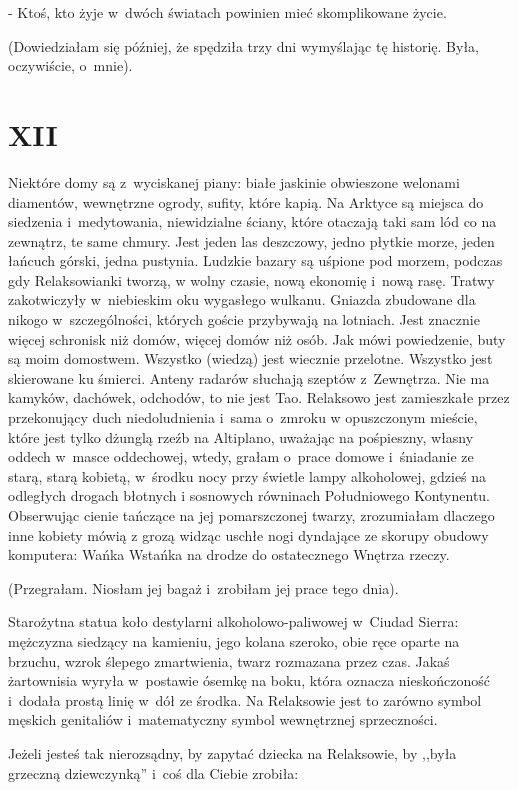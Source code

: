 \documentclass[oneside,polish,12pt,sfheadings]{mwbk}
\begin{document}
- Ktoś, kto żyje w~dwóch światach powinien mieć
skomplikowane życie.

(Dowiedziałam się później, że spędziła trzy dni wymyślając tę historię.
Była, oczywiście, o~mnie).

\chapter{XII}

Niektóre domy są z~wyciskanej piany: białe jaskinie obwieszone welonami
diamentów, wewnętrzne ogrody, sufity, które kapią. Na Arktyce są miejsca
do siedzenia i~medytowania, niewidzialne ściany, które otaczają taki
sam lód co na zewnątrz, te same chmury. Jest jeden las deszczowy,
jedno płytkie morze, jeden łańcuch górski, jedna pustynia. Ludzkie
bazary są uśpione pod morzem, podczas gdy Relaksowianki tworzą, w
wolny czasie, nową ekonomię i~nową rasę. Tratwy zakotwiczyły w~niebieskim
oku wygasłego wulkanu. Gniazda zbudowane dla nikogo w~szczególności,
których goście przybywają na lotniach. Jest znacznie więcej schronisk
niż domów, więcej domów niż osób. Jak mówi powiedzenie, buty są moim
domostwem. Wszystko (wiedzą) jest wiecznie przelotne. Wszystko jest
skierowane ku śmierci. Anteny radarów słuchają szeptów z~Zewnętrza.
Nie ma kamyków, dachówek, odchodów, to nie jest Tao. Relaksowo jest
zamieszkałe przez przekonujący duch niedoludnienia i~sama o~zmroku
w opuszczonym mieście, które jest tylko dżunglą rzeźb na Altiplano,
uważając na pośpieszny, własny oddech w~masce oddechowej, wtedy, grałam
o~prace domowe i~śniadanie ze starą, starą kobietą, w~środku nocy
przy świetle lampy alkoholowej, gdzieś na odległych drogach błotnych
i sosnowych równinach Południowego Kontynentu. Obserwując cienie tańczące
na jej pomarszczonej twarzy, zrozumiałam dlaczego inne kobiety mówią
z grozą widząc uschłe nogi dyndające ze skorupy obudowy komputera:
Wańka Wstańka na drodze do ostatecznego Wnętrza rzeczy.

(Przegrałam. Niosłam jej bagaż i~zrobiłam jej prace tego dnia).

Starożytna statua koło destylarni alkoholowo-paliwowej w~Ciudad Sierra:
mężczyzna siedzący na kamieniu, jego kolana szeroko, obie ręce oparte
na brzuchu, wzrok ślepego zmartwienia, twarz rozmazana przez czas.
Jakaś żartownisia wyryła w~postawie ósemkę na boku, która oznacza
nieskończoność i~dodała prostą linię w~dół ze środka. Na Relaksowie
jest to zarówno symbol męskich genitaliów i~matematyczny symbol wewnętrznej
sprzeczności.

Jeżeli jesteś tak nierozsądny, by zapytać dziecka na Relaksowie, by
,,była grzeczną dziewczynką'' i~coś dla Ciebie zrobiła: 
\end{document}
